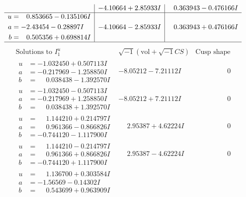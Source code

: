 \documentclass[1p]{elsarticle_modified}
\theoremstyle{definition}
\newcommand{\I}{\sqrt{-1}}
\begin{document}
$$\begin{array}{c|c|c}
 & -4.10664 + 2.85933 I & \phantom{-}0.363943 - 0.476166 I \\ \hline\begin{aligned}
u &= \phantom{-}0.853665 - 0.135106 I \\
a &= -2.43454 - 0.28897 I \\
b &= \phantom{-}0.505356 + 0.698814 I\end{aligned}
 & -4.10664 - 2.85933 I & \phantom{-}0.363943 + 0.476166 I\\
 \hline 
 \end{array}$$\newpage$$\begin{array}{c|c|c}  
\text{Solutions to }I^u_{1}& \I (\text{vol} + \sqrt{-1}CS) & \text{Cusp shape}\\
 \hline 
\begin{aligned}
u &= -1.032450 + 0.507113 I \\
a &= -0.217969 - 1.258850 I \\
b &= \phantom{-}0.038438 - 1.392570 I\end{aligned}
 & -8.05212 - 7.21112 I & \phantom{-0.000000 } 0 \\ \hline\begin{aligned}
u &= -1.032450 - 0.507113 I \\
a &= -0.217969 + 1.258850 I \\
b &= \phantom{-}0.038438 + 1.392570 I\end{aligned}
 & -8.05212 + 7.21112 I & \phantom{-0.000000 } 0 \\ \hline\begin{aligned}
u &= \phantom{-}1.144210 + 0.214797 I \\
a &= \phantom{-}0.961366 - 0.866826 I \\
b &= -0.744120 - 1.117900 I\end{aligned}
 & \phantom{-}2.95387 + 4.62224 I & \phantom{-0.000000 } 0 \\ \hline\begin{aligned}
u &= \phantom{-}1.144210 - 0.214797 I \\
a &= \phantom{-}0.961366 + 0.866826 I \\
b &= -0.744120 + 1.117900 I\end{aligned}
 & \phantom{-}2.95387 - 4.62224 I & \phantom{-0.000000 } 0 \\ \hline\begin{aligned}
u &= \phantom{-}1.136700 + 0.303584 I \\
a &= -1.56569 - 0.14302 I \\
b &= \phantom{-}0.543699 + 0.963909 I\end{aligned}

\end{array}$$
\end{document}
